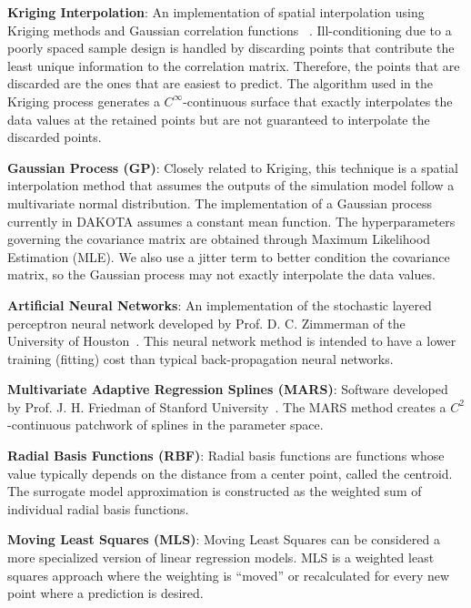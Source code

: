 \textbf{Kriging Interpolation}: An implementation of spatial
interpolation using Kriging methods and Gaussian correlation functions
~\cite{Giu98}.  Ill-conditioning due to a poorly spaced sample design is 
handled by discarding points that contribute the least unique information
to the correlation matrix.  Therefore, the points that are discarded are 
the ones that are easiest to predict.  The algorithm used in the Kriging 
process generates a $C^\infty$-continuous surface that exactly interpolates 
the data values at the retained points but are not guaranteed to 
interpolate the discarded points.

\textbf{Gaussian Process (GP)}: Closely related to Kriging, this
technique is a spatial interpolation method that assumes the outputs
of the simulation model follow a multivariate normal distribution.
The implementation of a Gaussian process currently in DAKOTA assumes
a constant mean function.  The hyperparameters governing the covariance
matrix are obtained through Maximum Likelihood Estimation (MLE). We also use
a jitter term to better condition the covariance matrix, so the Gaussian
process may not exactly interpolate the data values.

\textbf{Artificial Neural Networks}: An implementation of the
stochastic layered perceptron neural network developed by Prof. D. C.
Zimmerman of the University of Houston~\cite{Zim96}. This neural network
method is intended to have a lower training (fitting) cost than
typical back-propagation neural networks.

\textbf{Multivariate Adaptive Regression Splines (MARS)}: Software
developed by Prof. J. H. Friedman of Stanford University~\cite{Fri91}.
The MARS method creates a $C^2$-continuous patchwork of splines in the
parameter space.

\textbf{Radial Basis Functions (RBF)}:  Radial basis functions are 
functions whose value typically depends on the distance from a center point, 
called the centroid.  The surrogate model approximation is constructed
as the weighted sum of individual radial basis functions. 

\textbf{Moving Least Squares (MLS)}: Moving Least Squares can be 
considered a more specialized version of linear regression models.
MLS is a weighted least squares approach where the weighting is 
``moved'' or recalculated for every new point where 
a prediction is desired.~\cite{Nea04} 


